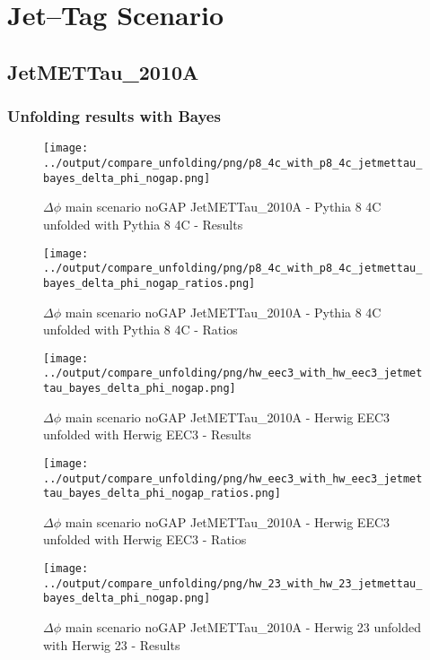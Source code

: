 \documentclass[11pt]{book}
\begin{document}
\cleardoublepage
\chapter{Jet--Tag Scenario}
\section{JetMETTau\_2010A}
\subsection{Unfolding results with Bayes}

\begin{figure}[ht]
\centering
\texttt{[image: ../output/compare\_unfolding/png/p8\_4c\_with\_p8\_4c\_jetmettau\_bayes\_delta\_phi\_nogap.png]}
\caption{$\Delta\phi$ main scenario noGAP JetMETTau\_2010A - Pythia 8 4C unfolded with Pythia 8 4C - Results}
\label{p8_p8_jetmettau_bayes_delta_phi_nogap_a}
\end{figure}

\begin{figure}[ht]
\centering
\texttt{[image: ../output/compare\_unfolding/png/p8\_4c\_with\_p8\_4c\_jetmettau\_bayes\_delta\_phi\_nogap\_ratios.png]}
\caption{$\Delta\phi$ main scenario noGAP JetMETTau\_2010A - Pythia 8 4C unfolded with Pythia 8 4C - Ratios}
\label{p8_p8_jetmettau_bayes_delta_phi_nogap_b}
\end{figure}

\begin{figure}[ht]
\centering
\texttt{[image: ../output/compare\_unfolding/png/hw\_eec3\_with\_hw\_eec3\_jetmettau\_bayes\_delta\_phi\_nogap.png]}
\caption{$\Delta\phi$ main scenario noGAP JetMETTau\_2010A - Herwig EEC3 unfolded with Herwig EEC3 - Results}
\label{hw_eec3_hw_eec3_jetmettau_bayes_delta_phi_nogap_a}
\end{figure}

\begin{figure}[ht]
\centering
\texttt{[image: ../output/compare\_unfolding/png/hw\_eec3\_with\_hw\_eec3\_jetmettau\_bayes\_delta\_phi\_nogap\_ratios.png]}
\caption{$\Delta\phi$ main scenario noGAP JetMETTau\_2010A - Herwig EEC3 unfolded with Herwig EEC3 - Ratios}
\label{hw_eec3_hw_eec3_jetmettau_bayes_delta_phi_nogap_b}
\end{figure}

\begin{figure}[ht]
\centering
\texttt{[image: ../output/compare\_unfolding/png/hw\_23\_with\_hw\_23\_jetmettau\_bayes\_delta\_phi\_nogap.png]}
\caption{$\Delta\phi$ main scenario noGAP JetMETTau\_2010A - Herwig 23 unfolded with Herwig 23 - Results}
\label{hw_23_hw_23_jetmettau_bayes_delta_phi_nogap_a}
\end{figure}
\end{document}

